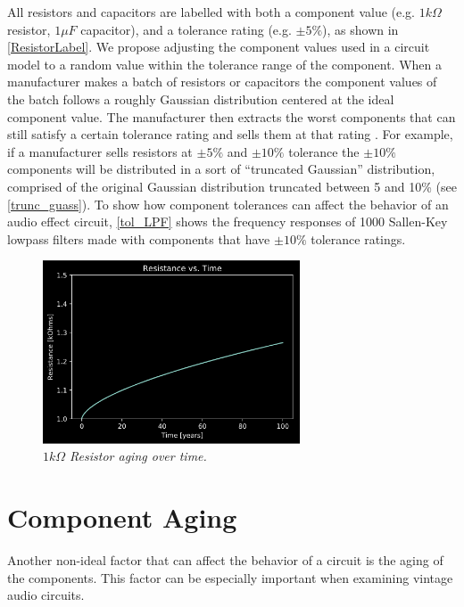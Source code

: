 \documentclass[twoside,a4paper]{article}
\begin{document}
%
All resistors and capacitors are labelled with both a
component value (e.g. $1 k\Omega$ resistor, $1 \mu F$
capacitor), and a tolerance rating (e.g. $\pm 5\%$), as
shown in \cref{ResistorLabel}. We propose adjusting the
component values used in a circuit model to a random
value within the tolerance range of the component.
\newline\newline
When a manufacturer makes a batch of resistors or capacitors
the component values of the batch follows a roughly Gaussian
distribution centered at the ideal component value. The manufacturer
then extracts the worst components that can still satisfy a certain
tolerance rating and sells them at that rating \cite{tolerance}.
For example, if a
manufacturer sells resistors at $\pm 5\%$ and $\pm 10\%$ tolerance
the $\pm 10\%$ components will be distributed in a sort of ``truncated
Gaussian'' distribution, comprised of the original Gaussian
distribution truncated between 5 and 10\% (see \cref{trunc_guass}).
To show how component tolerances can affect the behavior of an audio
effect circuit, \cref{tol_LPF} shows the frequency responses of 1000
Sallen-Key lowpass filters made with components that have $\pm 10\%$
tolerance ratings.
%
%
\begin{figure}[h]
    \center
    \includegraphics[width=3in]{../CMAging/Pics/r_time.png}
    \caption{\label{res-age}{\it $1 k\Omega$ Resistor aging over time.}}
\end{figure}
%
\section{Component Aging} \label{sec:age}
%
Another non-ideal factor that can affect the behavior of a circuit is
the aging of the components. This factor can be especially important
when examining vintage audio circuits.
%
\end{document}
